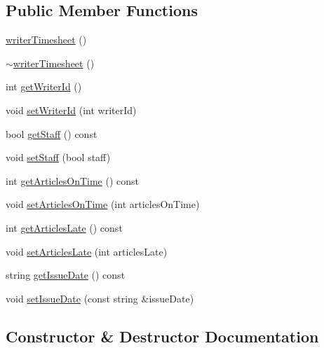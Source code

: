 \subsection*{Public Member Functions}
\begin{DoxyCompactItemize}
\item 
\hyperlink{classwriter_timesheet_abf402ae1108b3c5b60041f18d6151a1d}{writer\+Timesheet} ()
\item 
\hyperlink{classwriter_timesheet_a8736b4b1f28628b6bb347c7c42aca914}{$\sim$writer\+Timesheet} ()
\item 
int \hyperlink{classwriter_timesheet_a279d4d0c8f6e1e85fd729b1731f24e2d}{get\+Writer\+Id} ()
\item 
void \hyperlink{classwriter_timesheet_aab5ffe6db6ad7fe9e04495a244acd63f}{set\+Writer\+Id} (int writer\+Id)
\item 
bool \hyperlink{classwriter_timesheet_acdf79ecca1791b1338272d3341b8709c}{get\+Staff} () const 
\item 
void \hyperlink{classwriter_timesheet_a8fb9e071d45e3985f6feaf832b900bee}{set\+Staff} (bool staff)
\item 
int \hyperlink{classwriter_timesheet_af534ed4f650458f0a2bd60a8b0c3bc69}{get\+Articles\+On\+Time} () const 
\item 
void \hyperlink{classwriter_timesheet_a2820d9bc6aafd6c4eb206be2639ba615}{set\+Articles\+On\+Time} (int articles\+On\+Time)
\item 
int \hyperlink{classwriter_timesheet_a0cccbce0ce5258c1e4ffca533f33e7d3}{get\+Articles\+Late} () const 
\item 
void \hyperlink{classwriter_timesheet_ad423c078df73b6843b873fcac3f0c44c}{set\+Articles\+Late} (int articles\+Late)
\item 
string \hyperlink{classwriter_timesheet_ad081c32f625feb89de848433f85a9aaf}{get\+Issue\+Date} () const 
\item 
void \hyperlink{classwriter_timesheet_a1e725b93f6c46404c8f308b93b51358b}{set\+Issue\+Date} (const string \&issue\+Date)
\end{DoxyCompactItemize}


\subsection{Constructor \& Destructor Documentation}
\hypertarget{classwriter_timesheet_abf402ae1108b3c5b60041f18d6151a1d}{}
